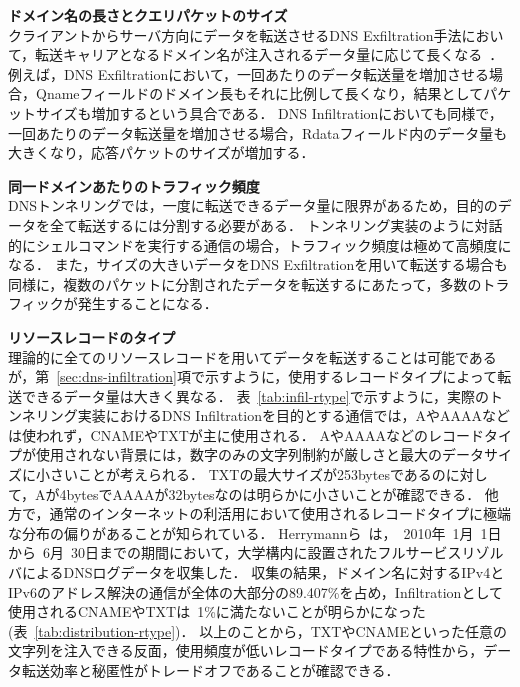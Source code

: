 \hspace{-12pt}\textbf{ドメイン名の長さとクエリパケットのサイズ}\\
\hspace{12pt}クライアントからサーバ方向にデータを転送させるDNS Exfiltration手法において，転送キャリアとなるドメイン名が注入されるデータ量に応じて長くなる~\cite{vern}．
例えば，DNS Exfiltrationにおいて，一回あたりのデータ転送量を増加させる場合，Qnameフィールドのドメイン長もそれに比例して長くなり，結果としてパケットサイズも増加するという具合である．
DNS Infiltrationにおいても同様で，一回あたりのデータ転送量を増加させる場合，Rdataフィールド内のデータ量も大きくなり，応答パケットのサイズが増加する．



\hspace{-12pt}\textbf{同一ドメインあたりのトラフィック頻度}\\
\hspace{12pt}DNSトンネリングでは，一度に転送できるデータ量に限界があるため，目的のデータを全て転送するには分割する必要がある．
トンネリング実装のように対話的にシェルコマンドを実行する通信の場合，トラフィック頻度は極めて高頻度になる．
また，サイズの大きいデータをDNS Exfiltrationを用いて転送する場合も同様に，複数のパケットに分割されたデータを転送するにあたって，多数のトラフィックが発生することになる．\newline

\hspace{-12pt}\textbf{リソースレコードのタイプ}\\
\hspace{12pt}理論的に全てのリソースレコードを用いてデータを転送することは可能であるが，第~\ref{sec:dns-infiltration}項で示すように，使用するレコードタイプによって転送できるデータ量は大きく異なる．
表~\ref{tab:infil-rtype}で示すように，実際のトンネリング実装におけるDNS Infiltrationを目的とする通信では，AやAAAAなどは使われず，CNAMEやTXTが主に使用される．
AやAAAAなどのレコードタイプが使用されない背景には，数字のみの文字列制約が厳しさと最大のデータサイズに小さいことが考えられる．
TXTの最大サイズが253bytesであるのに対して，Aが4bytesでAAAAが32bytesなのは明らかに小さいことが確認できる．
他方で，通常のインターネットの利活用において使用されるレコードタイプに極端な分布の偏りがあることが知られている．
Herrymannら~\cite{Herrymann}は，~2010年~1月~1日から~6月~30日までの期間において，大学構内に設置されたフルサービスリゾルバによるDNSログデータを収集した．
収集の結果，ドメイン名に対するIPv4とIPv6のアドレス解決の通信が全体の大部分の89.407\%を占め，Infiltrationとして使用されるCNAMEやTXTは~1\%に満たないことが明らかになった(表~\ref{tab:distribution-rtype})．
以上のことから，TXTやCNAMEといった任意の文字列を注入できる反面，使用頻度が低いレコードタイプである特性から，データ転送効率と秘匿性がトレードオフであることが確認できる．


